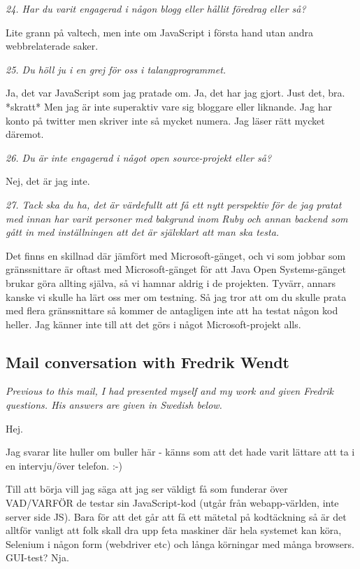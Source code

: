 \documentclass[11pt]{article}
\begin{document}
\emph{24. Har du varit engagerad i någon blogg eller hållit föredrag eller så?}

Lite grann på valtech, men inte om JavaScript i första hand utan andra webbrelaterade saker.

\emph{25. Du höll ju i en grej för oss i talangprogrammet.}

Ja, det var JavaScript som jag pratade om. Ja, det har jag gjort. Just det, bra. *skratt* Men jag är inte superaktiv vare sig bloggare eller liknande. Jag har konto på twitter men skriver inte så mycket numera. Jag läser rätt mycket däremot.

\emph{26. Du är inte engagerad i något open source-projekt eller så?}

Nej, det är jag inte.

\emph{27. Tack ska du ha, det är värdefullt att få ett nytt perspektiv för de jag pratat med innan har varit personer med bakgrund inom Ruby och annan backend som gått in med inställningen att det är självklart att man ska testa.}

Det finns en skillnad där jämfört med Microsoft-gänget, och vi som jobbar som gränssnittare är oftast med Microsoft-gänget för att Java Open Systems-gänget brukar göra allting själva, så vi hamnar aldrig i de projekten. Tyvärr, annars kanske vi skulle ha lärt oss mer om testning. Så jag tror att om du skulle prata med flera gränssnittare så kommer de antagligen inte att ha testat någon kod heller. Jag känner inte till att det görs i något Microsoft-projekt alls.


\subsection*{Mail conversation with Fredrik Wendt}

\emph{Previous to this mail, I had presented myself and my work and given Fredrik questions. His answers are given in Swedish below.}

Hej.

Jag svarar lite huller om buller här - känns som att det hade varit
lättare att ta i en intervju/över telefon. :-)

Till att börja vill jag säga att jag ser väldigt få som funderar över
VAD/VARFÖR de testar sin JavaScript-kod (utgår från webapp-världen, inte
server side JS). Bara för att det går att få ett mätetal på %
kodtäckning så är det alltför vanligt att folk skall dra upp feta
maskiner där hela systemet kan köra, Selenium i någon form (webdriver
etc) och långa körningar med många browsers. GUI-test? Nja.
\end{document}
